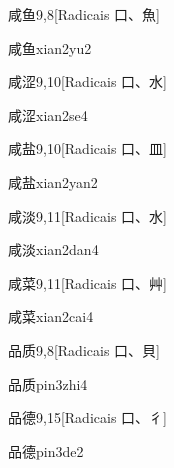 \begin{entry}{咸鱼}{9,8}[Radicais ⼝、⿂]
  \begin{phonetics}{咸鱼}{xian2yu2}
  \end{phonetics}
\end{entry}

\begin{entry}{咸涩}{9,10}[Radicais ⼝、⽔]
  \begin{phonetics}{咸涩}{xian2se4}
  \end{phonetics}
\end{entry}

\begin{entry}{咸盐}{9,10}[Radicais ⼝、⽫]
  \begin{phonetics}{咸盐}{xian2yan2}
  \end{phonetics}
\end{entry}

\begin{entry}{咸淡}{9,11}[Radicais ⼝、⽔]
  \begin{phonetics}{咸淡}{xian2dan4}
  \end{phonetics}
\end{entry}

\begin{entry}{咸菜}{9,11}[Radicais ⼝、⾋]
  \begin{phonetics}{咸菜}{xian2cai4}
  \end{phonetics}
\end{entry}

\begin{entry}{品质}{9,8}[Radicais ⼝、⾙]
  \begin{phonetics}{品质}{pin3zhi4}
  \end{phonetics}
\end{entry}

\begin{entry}{品德}{9,15}[Radicais ⼝、⼻]
  \begin{phonetics}{品德}{pin3de2}
  \end{phonetics}
\end{entry}

